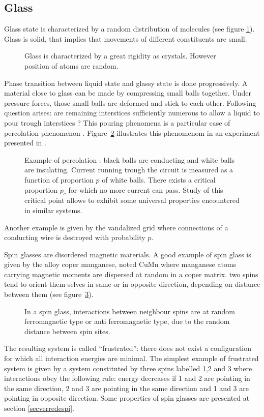 \documentclass[12pt]{book}
\begin{document}
\subsection{Glass}\label{secglassyspin}
Glass state \cite{ph:mater:Zallen83} is characterized by a random distribution
of molecules (see figure
\ref{figglass}). Glass is solid, that implies that movements of
different constituents are small.
\begin{figure}[htb]
 \centerline{}   
 \caption{Glass is characterized by a great rigidity as crystals. However
   position of atoms are random.}
 \label{figglass}
\end{figure}
Phase transition between liquid state and glassy state is done progressively.
A material close to glass can be made by compressing small balls
together. Under pressure forces, those small balls are deformed and stick to
each other. Following question arises: are remaining interstices  
sufficiently numerous to allow a liquid to pour trough interstices ? This
pouring phenomena is a particular case of percolation
phenomenon \cite{ph:mater:Zallen83}. Figure~\ref{figpercol}
illustrates this phenomenom in an experiment presented in \cite{ph:mater:Zallen83}.
\begin{figure}[htb]
 \centerline{}   
 \caption{Example of percolation : black balls are conducting and white balls
   are insulating. Current running trough the circuit is measured as a
   function of proportion $p$ of white balls. There exists a critical
   proportion $p_c$ for which no more current can pass. Study of this critical
   point allows to exhibit some universal properties encountered in similar
   systems.}  
 \label{figpercol}
\end{figure}
Another example is given by the vandalized grid \cite{ph:mater:Zallen83} where
connections of a conducting wire is destroyed with probability $p$.

Spin glasses are disordered magnetic materials. A good example of spin glass
is given by the alloy coper manganese, noted CuMn where manganese atoms
carrying magnetic moments are dispersed at random in a coper matrix. two spins
tend to orient them selves in same or in opposite direction, depending on
distance between them (see figure~\ref{figspinglass}).
\begin{figure}[htb]
 \centerline{}   
 \caption{In a spin glass, interactions between neighbour spins are at random
   ferromagnetic type or anti ferromagnetic type, due to the random distance
   between spin sites.}
 \label{figspinglass}
\end{figure}
The resulting system is called ``frustrated'': there does not exist a
configuration for which all interaction energies are minimal. The simplest
example of frustrated system is given by a system constituted by three spins
labelled 1,2 and 3 where interactions obey the following rule:
energy decreases if 1 and 2 are pointing in the same direction, 2 and 3 are
pointing in the same direction and 1 and 3 are pointing in opposite direction.
Some properties of spin glasses are presented at section
\ref{secverredespi}.
\end{document}
